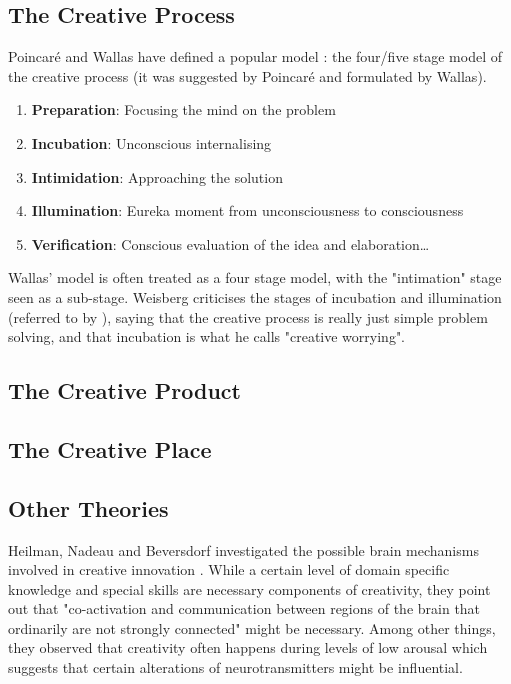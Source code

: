 \subsection{The Creative Process}

Poincaré and Wallas \citep{Wallas1926} have defined a popular model \citep{Boden2003, Partridge1994, Koestler1964}: the four/five stage model of the creative process (it was suggested by Poincaré and formulated by Wallas).

\begin{enumerate}
  \item \textbf{Preparation}: Focusing the mind on the problem
  \item \textbf{Incubation}: Unconscious internalising
  \item \textbf{Intimidation}: Approaching the solution
  \item \textbf{Illumination}: Eureka moment from unconsciousness to consciousness
  \item \textbf{Verification}: Conscious evaluation of the idea and elaboration…
\end{enumerate}

Wallas' model is often treated as a four stage model, with the "intimation" stage seen as a sub-stage. Weisberg criticises the stages of incubation and illumination (referred to by \citep{Leary1964}), saying that the creative process is really just simple problem solving, and that incubation is what he calls "creative worrying".

\subsection{The Creative Product}
\subsection{The Creative Place}
\subsection*{Other Theories}

Heilman, Nadeau and Beversdorf investigated the possible brain mechanisms involved in creative innovation \citep{Heilman2003}. While a certain level of domain specific knowledge and special skills are necessary components of creativity, they point out that "co-activation and communication between regions of the brain that ordinarily are not strongly connected" might be necessary. Among other things, they observed that creativity often happens during levels of low arousal which suggests that certain alterations of neurotransmitters might be influential.

